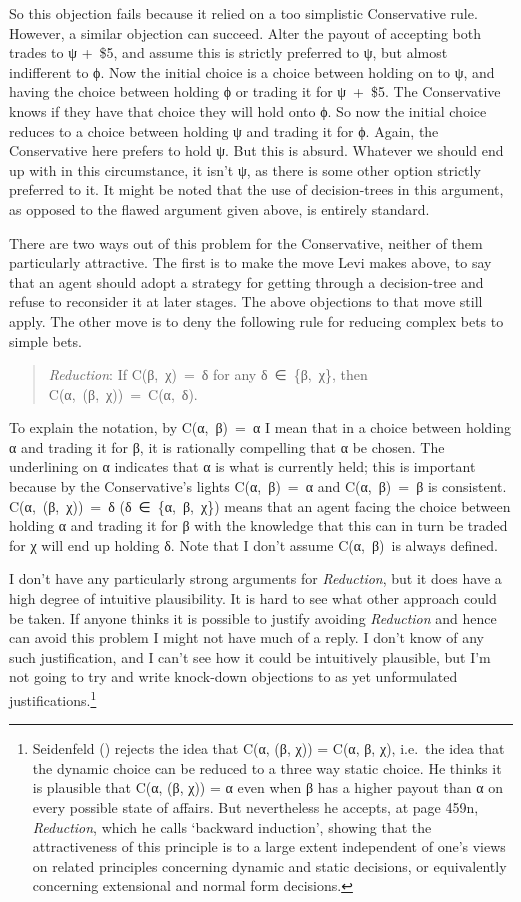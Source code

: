\documentclass[
  10pt,
  letterpaper,
  DIV=11,
  numbers=noendperiod,
  twoside]{scrartcl}
\begin{document}
So this objection fails because it relied on a too simplistic
Conservative rule. However, a similar objection can succeed. Alter the
payout of accepting both trades to ψ +~\$5, and assume this is strictly
preferred to ψ, but almost indifferent to ϕ. Now the initial choice is a
choice between holding on to ψ, and having the choice between holding ϕ
or trading it for ψ~+~\$5. The Conservative knows if they have that
choice they will hold onto ϕ. So now the initial choice reduces to a
choice between holding ψ and trading it for ϕ. Again, the Conservative
here prefers to hold ψ. But this is absurd. Whatever we should end up
with in this circumstance, it isn't ψ, as there is some other option
strictly preferred to it. It might be noted that the use of
decision-trees in this argument, as opposed to the flawed argument given
above, is entirely standard.

There are two ways out of this problem for the Conservative, neither of
them particularly attractive. The first is to make the move Levi makes
above, to say that an agent should adopt a strategy for getting through
a decision-tree and refuse to reconsider it at later stages. The above
objections to that move still apply. The other move is to deny the
following rule for reducing complex bets to simple bets.

\begin{quote}
\emph{Reduction}: If C(β,~χ)~=~δ for any δ~∈~\{β,~χ\}, then
C(α,~(β,~χ))~=~C(α,~δ).
\end{quote}

To explain the notation, by C(α,~β)~=~α I mean that in a choice between
holding α and trading it for β, it is rationally compelling that α be
chosen. The underlining on α indicates that α is what is currently held;
this is important because by the Conservative's lights C(α,~β)~=~α and
C(α,~β)~=~β is consistent. C(α,~(β,~χ))~=~δ (δ~∈~\{α,~β,~χ\}) means that
an agent facing the choice between holding α and trading it for β with
the knowledge that this can in turn be traded for χ will end up holding
δ. Note that I don't assume C(α,~β)~is always defined.

I don't have any particularly strong arguments for \emph{Reduction}, but
it does have a high degree of intuitive plausibility. It is hard to see
what other approach could be taken. If anyone thinks it is possible to
justify avoiding \emph{Reduction} and hence can avoid this problem I
might not have much of a reply. I don't know of any such justification,
and I can't see how it could be intuitively plausible, but I'm not going
to try and write knock-down objections to as yet unformulated
justifications.\footnote{Seidenfeld
  () rejects the idea that C(α, (β,
  χ)) = C(α, β, χ), i.e.~the idea that the dynamic choice can be reduced
  to a three way static choice. He thinks it is plausible that C(α, (β,
  χ)) = α even when β has a higher payout than α on every possible state
  of affairs. But nevertheless he accepts, at page 459n,
  \emph{Reduction}, which he calls `backward induction', showing that
  the attractiveness of this principle is to a large extent independent
  of one's views on related principles concerning dynamic and static
  decisions, or equivalently concerning extensional and normal form
  decisions.}
\end{document}
